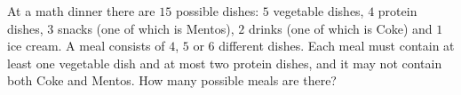 At a math dinner there are $15$ possible dishes: $5$ vegetable dishes, $4$ protein dishes, $3$ snacks (one of which is Mentos), $2$ drinks (one of which is Coke) and $1$ ice cream. A meal consists of $4$, $5$ or $6$ different dishes. Each meal must contain at least one vegetable dish and at most two protein dishes, and it may not contain both Coke and Mentos. How many possible meals are there?
